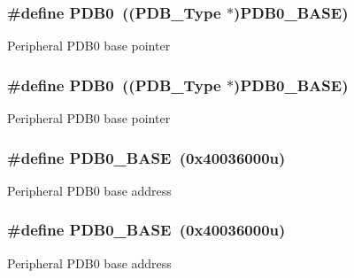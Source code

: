 \subsubsection[{\texorpdfstring{P\+D\+B0}{PDB0}}]{\setlength{\rightskip}{0pt plus 5cm}\#define P\+D\+B0~(({\bf P\+D\+B\+\_\+\+Type} $\ast$){\bf P\+D\+B0\+\_\+\+B\+A\+SE})}\hypertarget{group__PDB__Peripheral__Access__Layer_ga91cdd5c74efea207fd5cf60bb271b90c}{}\label{group__PDB__Peripheral__Access__Layer_ga91cdd5c74efea207fd5cf60bb271b90c}
Peripheral P\+D\+B0 base pointer 
\subsubsection[{\texorpdfstring{P\+D\+B0}{PDB0}}]{\setlength{\rightskip}{0pt plus 5cm}\#define P\+D\+B0~(({\bf P\+D\+B\+\_\+\+Type} $\ast$){\bf P\+D\+B0\+\_\+\+B\+A\+SE})}\hypertarget{group__PDB__Peripheral__Access__Layer_ga91cdd5c74efea207fd5cf60bb271b90c}{}\label{group__PDB__Peripheral__Access__Layer_ga91cdd5c74efea207fd5cf60bb271b90c}
Peripheral P\+D\+B0 base pointer 
\subsubsection[{\texorpdfstring{P\+D\+B0\+\_\+\+B\+A\+SE}{PDB0_BASE}}]{\setlength{\rightskip}{0pt plus 5cm}\#define P\+D\+B0\+\_\+\+B\+A\+SE~(0x40036000u)}\hypertarget{group__PDB__Peripheral__Access__Layer_gaca699dde276786b0443ef728ae1f01c0}{}\label{group__PDB__Peripheral__Access__Layer_gaca699dde276786b0443ef728ae1f01c0}
Peripheral P\+D\+B0 base address 
\subsubsection[{\texorpdfstring{P\+D\+B0\+\_\+\+B\+A\+SE}{PDB0_BASE}}]{\setlength{\rightskip}{0pt plus 5cm}\#define P\+D\+B0\+\_\+\+B\+A\+SE~(0x40036000u)}\hypertarget{group__PDB__Peripheral__Access__Layer_gaca699dde276786b0443ef728ae1f01c0}{}\label{group__PDB__Peripheral__Access__Layer_gaca699dde276786b0443ef728ae1f01c0}
Peripheral P\+D\+B0 base address 
